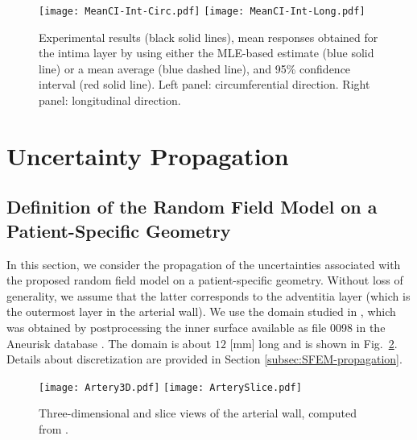 \begin{figure}[ht!]
    \begin{center}
        \texttt{[image: MeanCI-Int-Circ.pdf]} \texttt{[image: MeanCI-Int-Long.pdf]}
    \end{center}
    \caption[Experimental results obtained for the intima layer.]{Experimental results (black solid lines), mean responses obtained for the intima layer by using either the MLE-based estimate (blue solid line) or a mean average (blue dashed line), and 95\% confidence interval (red solid line). Left panel: circumferential direction. Right panel: longitudinal direction.}
    \label{fig:mean-int}
\end{figure}

\section{Uncertainty Propagation} \label{sec:uncertainty-propagation}


\subsection{Definition of the Random Field Model on a Patient-Specific Geometry}

In this section, we consider the propagation of the uncertainties associated with the proposed random field model on a patient-specific geometry. Without loss of generality, we assume that the latter corresponds to the adventitia layer (which is the outermost layer in the arterial wall). We use the domain studied in \cite{STABER201894}, which was obtained by postprocessing the inner surface available as file 0098 in the Aneurisk database \cite{AneuriskWeb}. The domain is about $12$ [mm] long and is shown in Fig.~\ref{fig:geometry}. Details about discretization are provided in Section \ref{subsec:SFEM-propagation}.
\begin{figure}[ht!]
    \begin{center}
        \texttt{[image: Artery3D.pdf]} \texttt{[image: ArterySlice.pdf]}
    \end{center}
    \caption[Three-dimensional and slice views of the arterial wall.]{Three-dimensional and slice views of the arterial wall, computed from \cite{AneuriskWeb}.}
    \label{fig:geometry}
\end{figure}

